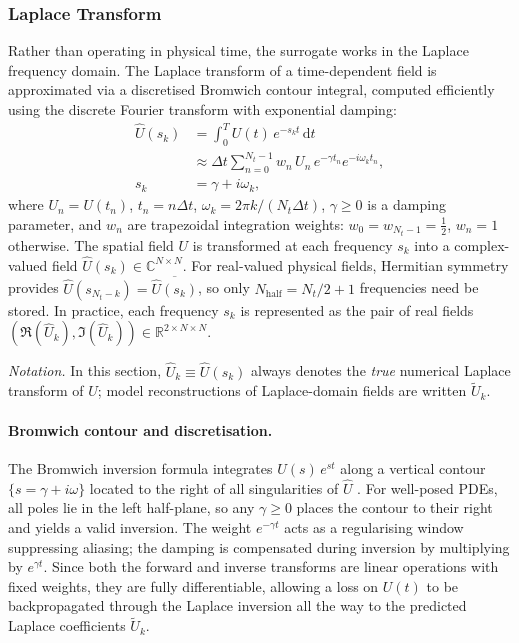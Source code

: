 \documentclass[a4paper, twocolumn]{article}
\newcommand{\R}{\mathbb{R}}
\newcommand{\C}{\mathbb{C}}
\begin{document}
\subsubsection{Laplace Transform}
\label{sec:laplace_transform}

Rather than operating in physical time, the surrogate works in the Laplace frequency domain. The Laplace transform of a time-dependent field is approximated via a discretised Bromwich contour integral, computed efficiently using the discrete Fourier transform with exponential damping:
\begin{equation}
\begin{split}
    \hat{U}(s_k) &= \int_0^T U(t)\,e^{-s_k t}\,\mathrm{d}t \\
    &\approx \Delta t \sum_{n=0}^{N_t-1} w_n\, U_n\, e^{-\gamma t_n} e^{-i\omega_k t_n}, \\
    s_k &= \gamma + i\omega_k,
\end{split}
    \label{eq:laplace}
\end{equation}
where $U_n = U(t_n)$, $t_n = n\Delta t$, $\omega_k = 2\pi k/(N_t \Delta t)$, $\gamma \geq 0$ is a damping parameter, and $w_n$ are trapezoidal integration weights: $w_0 = w_{N_t-1} = \tfrac{1}{2}$, $w_n = 1$ otherwise. The spatial field $U$ is transformed at each frequency $s_k$ into a complex-valued field $\hat{U}(s_k) \in \C^{N \times N}$. For real-valued physical fields, Hermitian symmetry provides $\hat{U}(s_{N_t-k}) = \overline{\hat{U}(s_k)}$, so only $N_{\mathrm{half}} = N_t/2 + 1$ frequencies need be stored. In practice, each frequency $s_k$ is represented as the pair of real fields $(\Re(\hat{U}_k), \Im(\hat{U}_k)) \in \R^{2 \times N \times N}$.

\emph{Notation.} In this section, $\hat{U}_k \equiv \hat{U}(s_k)$ always denotes the \emph{true} numerical Laplace transform of $U$; model reconstructions of Laplace-domain fields are written $\tilde{U}_k$.

\paragraph{Bromwich contour and discretisation.}
The Bromwich inversion formula integrates $\hat{U}(s)\,e^{st}$ along a vertical contour $\{s = \gamma + i\omega\}$ located to the right of all singularities of $\hat{U}$ \cite{abate1992fourier}. For well-posed PDEs, all poles lie in the left half-plane, so any $\gamma \geq 0$ places the contour to their right and yields a valid inversion. The weight $e^{-\gamma t}$ acts as a regularising window suppressing aliasing; the damping is compensated during inversion by multiplying by $e^{\gamma t}$. Since both the forward and inverse transforms are linear operations with fixed weights, they are fully differentiable, allowing a loss on $U(t)$ to be backpropagated through the Laplace inversion all the way to the predicted Laplace coefficients $\tilde{U}_k$.
\label{par:differentiability}
\end{document}
